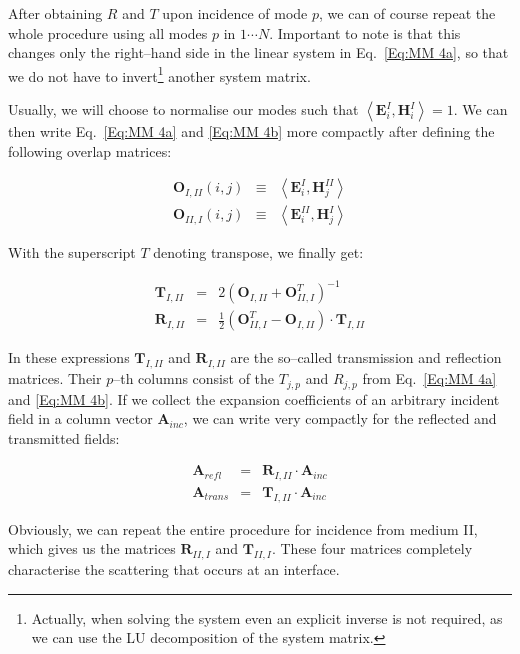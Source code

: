 After obtaining $R$ and $T$ upon incidence of mode $p$, we can
of course repeat the whole procedure using all modes $p$ in $ 1 \cdots N$.
Important to note is that this changes only the right--hand side in the linear system in Eq.~\ref{Eq:MM 4a}, so that we do not have to invert\footnote{%
Actually, when solving the system even an explicit inverse is not required,
as we can use the LU decomposition of the system matrix.
} another system matrix. 

Usually, we will choose to normalise our modes such that \( \left\langle \mathbf{E}^{I}_{i},\mathbf{H}^{I}_{i}\right\rangle =1 \).
We can then write Eq.~\ref{Eq:MM 4a} and \ref{Eq:MM 4b} more compactly after
defining the following overlap matrices:

\begin{eqnarray}
\mathbf{O}_{I,II}\left( i,j\right)  & \equiv  & \left\langle \mathbf{E}^{I}_{i},\mathbf{H}^{II}_{j}\right\rangle \label{Eq:O_I_II} \\
\mathbf{O}_{II,I}\left( i,j\right)  & \equiv  & \left\langle \mathbf{E}^{II}_{i},\mathbf{H}^{I}_{j}\right\rangle \label{Eq:O_II_I} 
\end{eqnarray}


With the superscript $T$ denoting transpose, we finally get:

\begin{eqnarray}
\mathbf{T}_{I,II} & = & 2\left( \mathbf{O}_{I,II}+\mathbf{O}^{T}_{II,I}\right) ^{-1}\label{Eq:MM 5a} \\
\mathbf{R}_{I,II} & = & \frac{1}{2}\left( \mathbf{O}^{T}_{II,I}-\mathbf{O}_{I,II}\right) \cdot \mathbf{T}_{I,II}\label{Eq:MM 5b} 
\end{eqnarray}


In these expressions $\mathbf{T}_{I,II}$ and $\mathbf{R}_{I,II}$ are
the so--called transmission and reflection matrices. Their \( p \)--th columns
consist of the $T_{j,p}$ and $R_{j,p}$ from Eq.~\ref{Eq:MM 4a} and
\ref{Eq:MM 4b}. If we collect the expansion coefficients of an arbitrary incident
field in a column vector $\mathbf{A}_{inc}$, we can write very compactly
for the reflected and transmitted fields: 

\begin{eqnarray}
\mathbf{A}_{refl} & = & \mathbf{R}_{I,II}\cdot \mathbf{A}_{inc}\label{Eq:R matrix} \\
\mathbf{A}_{trans} & = & \mathbf{T}_{I,II}\cdot \mathbf{A}_{inc}\label{Eq:T matrix} 
\end{eqnarray}

Obviously, we can repeat the entire procedure for incidence from medium II,
which gives us the matrices $\mathbf{R}_{II,I}$ and $\mathbf{T}_{II,I}$.
These four matrices completely characterise the scattering that occurs at an
interface.


